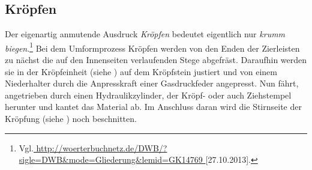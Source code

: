 \documentclass[12pt,a4paper,parskip]{scrartcl}
\begin{document}
\subsection{Kröpfen \label{sec:kropf}}
Der eigenartig anmutende Ausdruck \emph{Kröpfen} bedeutet eigentlich nur \emph{krumm biegen}.\footnote{Vgl.\url{
http://woerterbuchnetz.de/DWB/?sigle=DWB&mode=Gliederung&lemid=GK14769
}[27.10.2013].}
Bei dem Umformprozess Kröpfen werden von den  Enden der Zierleisten zu nächst die auf den Innenseiten verlaufenden Stege  abgefräst.  Daraufhin werden sie in der Kröpfeinheit (siehe ) auf dem Kröpfstein justiert und von einem Niederhalter durch die Anpresskraft einer Gasdruckfeder angepresst. Nun fährt, angetrieben durch einen Hydraulikzylinder, der Kröpf- oder auch Ziehstempel herunter und kantet das Material ab. Im Anschluss daran wird die Stirnseite der Kröpfung (siehe ) noch beschnitten.
\end{document}
